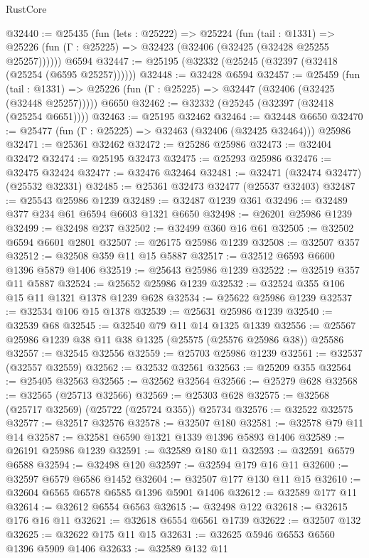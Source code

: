 \begin{lexlean}{RustCore}
\begin{coremodule}
@32440 := @25435
    (fun (lets : @25222) =>
    @25224
      (fun (tail : @1331) =>
      @25226 (fun (Γ : @25225) => @32423 (@32406 (@32425 (@32428 @25255 @25257))))))
    @6594
@32447 := @25195 (@32332 (@25245 (@32397 (@32418 (@25254 (@6595 @25257))))))
@32448 := @32428 @6594
@32457 := @25459
    (fun (tail : @1331) => @25226 (fun (Γ : @25225) => @32447 (@32406 (@32425 (@32448 @25257)))))
    @6650
@32462 := @32332 (@25245 (@32397 (@32418 (@25254 @6651))))
@32463 := @25195 @32462
@32464 := @32448 @6650
@32470 := @25477 (fun (Γ : @25225) => @32463 (@32406 (@32425 @32464))) @25986
@32471 := @25361 @32462
@32472 := @25286 @25986
@32473 := @32404 @32472
@32474 := @25195 @32473
@32475 := @25293 @25986
@32476 := @32475 @32424
@32477 := @32476 @32464
@32481 := @32471 (@32474 @32477) (@25532 @32331)
@32485 := @25361 @32473 @32477 (@25537 @32403)
@32487 := @25543 @25986 @1239
@32489 := @32487 @1239 @361
@32496 := @32489 @377 @234 @61 @6594 @6603 @1321 @6650
@32498 := @26201 @25986 @1239
@32499 := @32498 @237
@32502 := @32499 @360 @16 @61
@32505 := @32502 @6594 @6601 @2801
@32507 := @26175 @25986 @1239
@32508 := @32507 @357
@32512 := @32508 @359 @11 @15 @5887
@32517 := @32512 @6593 @6600 @1396 @5879 @1406
@32519 := @25643 @25986 @1239
@32522 := @32519 @357 @11 @5887
@32524 := @25652 @25986 @1239
@32532 := @32524 @355 @106 @15 @11 @1321 @1378 @1239 @628
@32534 := @25622 @25986 @1239
@32537 := @32534 @106 @15 @1378
@32539 := @25631 @25986 @1239
@32540 := @32539 @68
@32545 := @32540 @79 @11 @14 @1325 @1339
@32556 := @25567 @25986 @1239 @38 @11 @38 @1325 (@25575 (@25576 @25986 @38)) @25586
@32557 := @32545 @32556
@32559 := @25703 @25986 @1239
@32561 := @32537 (@32557 @32559)
@32562 := @32532 @32561
@32563 := @25209 @355
@32564 := @25405 @32563
@32565 := @32562 @32564
@32566 := @25279 @628
@32568 := @32565 (@25713 @32566)
@32569 := @25303 @628
@32575 := @32568 (@25717 @32569) (@25722 (@25724 @355)) @25734
@32576 := @32522 @32575
@32577 := @32517 @32576
@32578 := @32507 @180
@32581 := @32578 @79 @11 @14
@32587 := @32581 @6590 @1321 @1339 @1396 @5893 @1406
@32589 := @26191 @25986 @1239
@32591 := @32589 @180 @11
@32593 := @32591 @6579 @6588
@32594 := @32498 @120
@32597 := @32594 @179 @16 @11
@32600 := @32597 @6579 @6586 @1452
@32604 := @32507 @177 @130 @11 @15
@32610 := @32604 @6565 @6578 @6585 @1396 @5901 @1406
@32612 := @32589 @177 @11
@32614 := @32612 @6554 @6563
@32615 := @32498 @122
@32618 := @32615 @176 @16 @11
@32621 := @32618 @6554 @6561 @1739
@32622 := @32507 @132
@32625 := @32622 @175 @11 @15
@32631 := @32625 @5946 @6553 @6560 @1396 @5909 @1406
@32633 := @32589 @132 @11

\end{coremodule}
\end{lexlean}

